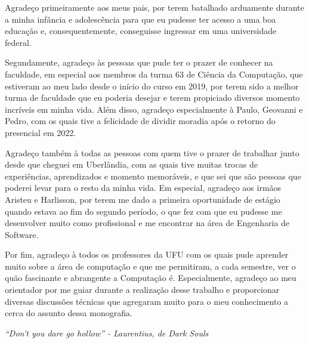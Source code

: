 \documentclass[12pt, %
openright, 
oneside, %
a4paper,    %
brazil]{facom-ufu-abntex2}
\begin{document}

\begin{agradecimentos}
    Agradeço primeiramente aos meus pais, por terem batalhado arduamente durante a minha infância e adolescência para que eu pudesse ter acesso a uma boa educação e, consequentemente, conseguisse ingressar em uma universidade federal.

    Segundamente, agradeço às pessoas que pude ter o prazer de conhecer na faculdade, em especial aos membros da turma 63 de Ciência da Computação, que estiveram ao meu lado desde o início do curso em 2019, por terem sido a melhor turma de faculdade que eu poderia desejar e terem propiciado diversos momento incríveis em minha vida. Além disso, agradeço especialmente à Paulo, Geovanni e Pedro, com os quais tive a felicidade de dividir moradia após o retorno do presencial em 2022.

    Agradeço também à todas as pessoas com quem tive o prazer de trabalhar junto desde que cheguei em Uberlândia, com as quais tive muitas trocas de experiências, aprendizados e momento memoráveis, e que sei que são pessoas que poderei levar para o resto da minha vida. Em especial, agradeço aos irmãos Aristeu e Harlisson, por terem me dado a primeira oportunidade de estágio quando estava ao fim do segundo período, o que fez com que eu pudesse me desenvolver muito como profissional e me encontrar na área de Engenharia de Software.

    Por fim, agradeço à todos os professores da UFU com os quais pude aprender muito sobre a área de computação e que me permitiram, a cada semestre, ver o quão fascinante e abrangente a Computação é. Especialmente, agradeço ao meu orientador por me guiar durante a realização desse trabalho e proporcionar diversas discussões técnicas que agregaram muito para o meu conhecimento a cerca do assunto dessa monografia.
\end{agradecimentos}

\begin{epigrafe}
    \vspace*{\fill}
    \begin{flushright}
        \textit{``Don't you dare go hollow'' - Laurentius, de Dark Souls}
    \end{flushright}
\end{epigrafe}
\end{document}
